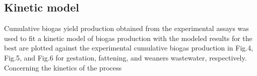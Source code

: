 \subsection{Kinetic model}
Cumulative biogas yield production obtained from the experimental assays was used to fit a kinetic model of biogas production with the modeled results for the best  are plotted against the experimental cumulative biogas production in Fig.4, Fig.5, and Fig.6 for gestation, fattening, and weaners wastewater, respectively.
Concerning the kinetics of the process